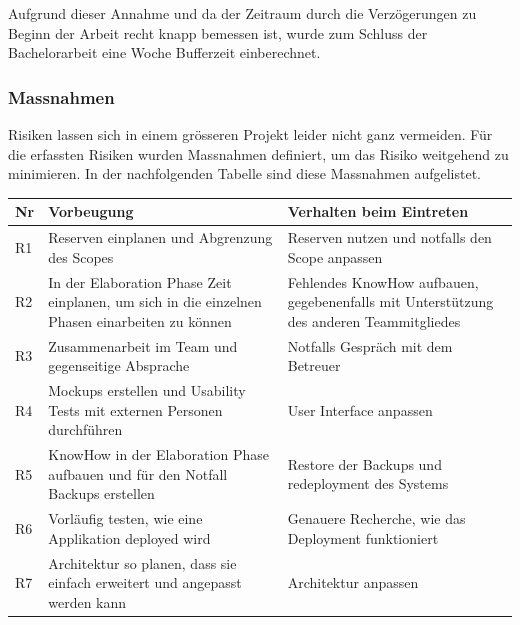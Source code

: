 Aufgrund dieser Annahme und da der Zeitraum durch die Verzögerungen zu Beginn der Arbeit recht knapp bemessen ist, wurde zum Schluss der Bachelorarbeit eine Woche Bufferzeit einberechnet. 

\newpage

\subsubsection*{Massnahmen}
Risiken lassen sich in einem grösseren Projekt leider nicht ganz vermeiden. Für die erfassten Risiken wurden Massnahmen definiert, um das Risiko weitgehend zu minimieren. In der nachfolgenden Tabelle sind diese Massnahmen aufgelistet.

\renewcommand{\arraystretch}{1.2}
\begin{table}[H]
	\centering
	\begin{tabu} to 0.9\textwidth {l X X}
	\toprule
	Nr & Vorbeugung & Verhalten beim Eintreten \\ 
	\midrule
	R1 & Reserven einplanen und Abgrenzung des Scopes & Reserven nutzen und notfalls den Scope anpassen \\
	R2 & In der Elaboration Phase Zeit einplanen, um sich in die einzelnen Phasen einarbeiten zu können & Fehlendes KnowHow aufbauen, gegebenenfalls mit Unterstützung des anderen Teammitgliedes \\
	R3 & Zusammenarbeit im Team und gegenseitige Absprache & Notfalls Gespräch mit dem Betreuer \\
	R4 & Mockups erstellen und Usability Tests mit externen Personen durchführen & User Interface anpassen \\
	R5 & KnowHow in der Elaboration Phase aufbauen und für den Notfall Backups erstellen & Restore der Backups und redeployment des Systems \\
	R6 & Vorläufig testen, wie eine Applikation deployed wird & Genauere Recherche, wie das Deployment funktioniert \\
	R7 & Architektur so planen, dass sie einfach erweitert und angepasst werden kann & Architektur anpassen \\
	\bottomrule
	\end{tabu}
\end{table}

